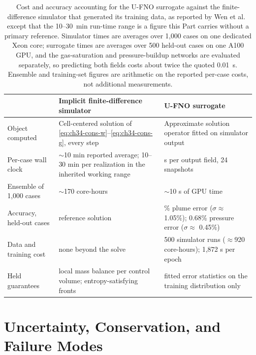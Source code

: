 \begin{table}[htbp]
\centering
\small
\caption{Cost and accuracy accounting for the U-FNO surrogate against the
finite-difference simulator that generated its training data, as reported by Wen et
al.~\cite{wen2022ufno} except that the 10--30~min run-time range is a figure this
Part carries without a primary reference. Simulator times are averages over 1,000 cases on one
dedicated Xeon core; surrogate times are averages over 500 held-out cases on one
A100 GPU, and the gas-saturation and pressure-buildup networks are evaluated
separately, so predicting both fields costs about twice the quoted 0.01~s.
Ensemble and training-set figures are arithmetic on the reported per-case costs,
not additional measurements.}
\label{tab:ch34-cost}
\begin{tabularx}{\textwidth}{l>{\raggedright\arraybackslash}X>{\raggedright\arraybackslash}X}
\toprule
 & \textbf{Implicit finite-difference simulator} & \textbf{U-FNO surrogate} \\
\midrule
Object computed &
  Cell-centered solution of \eqref{eq:ch34-cons-w}--\eqref{eq:ch34-cons-g}, every step &
  Approximate solution operator fitted on simulator output \\
Per-case wall clock &
  $\sim$10 min reported average; 10--30 min per realization in the inherited working range &
  0.010 s per output field, 24 snapshots \\
Ensemble of 1,000 cases &
  $\sim$170 core-hours &
  $\sim$10 s of GPU time \\
Accuracy, held-out cases &
  reference solution &
  1.6\% plume error ($\sigma \approx$ 1.05\%); 0.68\% pressure error ($\sigma \approx$ 0.45\%) \\
Data and training cost &
  none beyond the solve &
  5{,}500 simulator runs ($\approx$920 core-hours); 1{,}872 s per epoch \\
Held guarantees &
  local mass balance per control volume; entropy-satisfying fronts &
  fitted error statistics on the training distribution only \\
\bottomrule
\end{tabularx}
\end{table}

\section{Uncertainty, Conservation, and Failure Modes}

